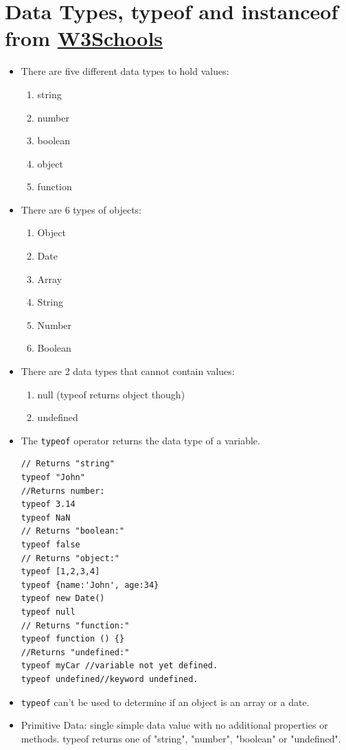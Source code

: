 \documentclass{report}
\begin{document}
\section{Data Types, typeof and instanceof from \href{https://www.w3schools.com/js/js_typeof.asp}{W3Schools}}
\begin{itemize}
\item There are five different data types to hold values:
\begin{enumerate}
    \item string
    \item number
    \item boolean
    \item object
    \item function
\end{enumerate}
\item There are 6 types of objects:
\begin{enumerate}
\item Object
\item Date
\item Array
\item String
\item Number
\item Boolean
\end{enumerate}
\item There are 2 data types that cannot contain values:
\begin{enumerate}
\item null (typeof returns object though)
\item undefined
\end{enumerate}
\item The \texttt{typeof} operator returns the data type of a variable.
\begin{lstlisting}
// Returns "string"
typeof "John"
//Returns number:
typeof 3.14
typeof NaN
// Returns "boolean:"
typeof false
// Returns "object:"
typeof [1,2,3,4]              
typeof {name:'John', age:34}  
typeof new Date()
typeof null
// Returns "function:"
typeof function () {}         
//Returns "undefined:"
typeof myCar //variable not yet defined.
typeof undefined//keyword undefined.
\end{lstlisting}
\item \texttt{typeof} can't be used to determine if an object is an array or a date.
\item Primitive Data: single simple data value with no additional properties or methods. typeof returns one of "string", "number", "boolean" or "undefined".

\end{itemize}
\end{document}
